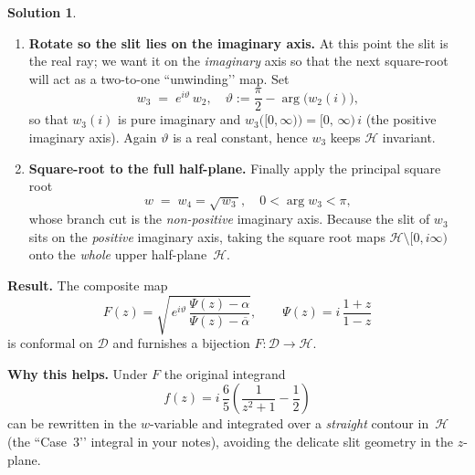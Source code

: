 \documentclass[12pt]{article}
\theoremstyle{definition} %
\newtheorem{solution}{Solution}
\theoremstyle{plain} %
\begin{document}
\begin{solution}
\begin{enumerate}[label=\textbf{Step \arabic*:}, itemsep=1.4ex]
    \item \textbf{Rotate so the slit lies on the imaginary axis.}\;
    At this point the slit is the real ray;
    we want it on the \emph{imaginary} axis so that the next square-root
    will act as a two-to-one “unwinding’’ map.
    Set
    \[
    w_3
       \;=\;
       e^{i\vartheta}\,w_2,
       \quad
       \vartheta
         := \frac{\pi}{2}-\arg\bigl(w_2(i)\bigr),
    \]
    so that $w_3(i)$ is pure imaginary and
    \(
       w_3\bigl([0,\infty)\bigr) = [0,\,\infty)\,i
    \)
    (the positive imaginary axis).
    Again $\vartheta$ is a real constant, hence $w_3$
    keeps $\mathcal H$ invariant.
    
    \item \textbf{Square-root to the full half-plane.}\;
    Finally apply the principal square root
    \[
    w \;=\; w_4
       = \sqrt{\,w_3\,},
       \quad 0<\arg w_3<\pi,
    \]
    whose branch cut is the \emph{non-positive} imaginary axis.
    Because the slit of $w_3$ sits on the \emph{positive} imaginary axis,
    taking the square root maps
    $\mathcal H\setminus[0,i\infty)$ onto the \emph{whole}
    upper half-plane~$\mathcal H$.
    
    \end{enumerate}
    
    \noindent
    \textbf{Result.}\;
    The composite map
    \[
    \boxed{
       F(z)
         = \sqrt{\,e^{i\vartheta}\,
                  \frac{\Psi(z)-\alpha}{\Psi(z)-\overline{\alpha}}
                },
       \qquad
       \Psi(z)=i\,\frac{1+z}{1-z}
     }
    \]
    is conformal on $\mathcal D$ and furnishes a bijection
    \(
       F:\mathcal D \to \mathcal H.
    \)
    
    \medskip
    \noindent
    \textbf{Why this helps.}\;
    Under $F$ the original integrand
    \[
    f(z)
       = i\,\frac65\!
         \left(\frac{1}{z^{2}+1}-\frac12\right)
    \]
    can be rewritten in the $w$-variable and integrated over a
    \emph{straight} contour in~$\mathcal H$
    (the ``Case~3’’ integral in your notes), avoiding the delicate slit
    geometry in the $z$-plane.
    \end{solution}
\end{document}
